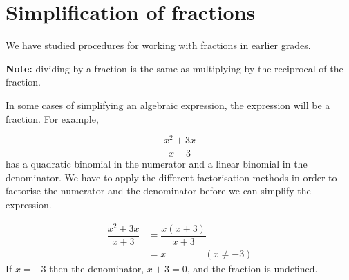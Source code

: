 \section{Simplification of fractions}
We have studied procedures for working with fractions in earlier grades.

\textbf{Note:} dividing by a fraction is the same as multiplying by the reciprocal of the fraction.
\par
In some cases of simplifying an algebraic expression, the expression will be a fraction. For example,

\begin{equation*}
  \dfrac{{x}^{2}+3x}{x+3}
\end{equation*}
has a quadratic binomial in the numerator and a linear binomial in the denominator. We have to apply the different factorisation methods in order to factorise the numerator and the denominator before we can simplify the expression.\par 

\begin{align*}
  \dfrac{{x}^{2}+3x}{x+3} &= \dfrac{x(x+3)}{x+3} \\
                          &= x \qquad\qquad (x\neq -3)
\end{align*}
If $x = -3$ then the denominator, $x+3 = 0$, and the fraction is undefined. 

